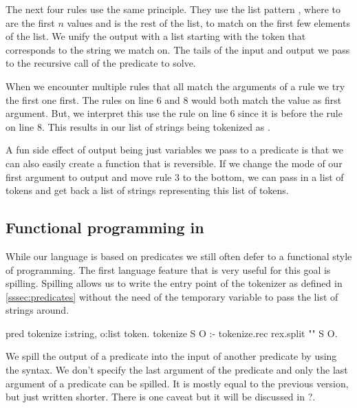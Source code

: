 \documentclass[thesis.tex]{subfiles}
\begin{document}
{The next four rules use the same principle. They use the list pattern \elpiinline{[E1, ..., En | TL]}, where  to  are the first $n$ values and  is the rest of the list, to match on the first few elements of the list. We unify the output with a list starting with the token that corresponds to the string we match on. The tails of the input and output we pass to the recursive call of the predicate to solve.

When we encounter multiple rules that all match the arguments of a rule we try the first one first. The rules on line 6 and 8 would both match the value \elpiinline{["/", "/", "="]} as first argument. But, we interpret this use the rule on line 6 since it is before the rule on line 8. This results in our list of strings being tokenized as .

A fun side effect of output being just variables we pass to a predicate is that we can also easily create a function that is reversible. If we change the mode of our first argument to output and move rule 3 to the bottom, we can pass in a list of tokens and get back a list of strings representing this list of tokens.

\subsection{Functional programming in \elpi}
While our language is based on predicates we still often defer to a functional style of programming. The first language feature that is very useful for this goal is spilling. Spilling allows us to write the entry point of the tokenizer as defined in \cref*{sssec:predicates} without the need of the temporary variable to pass the list of strings around.
\begin{elpicode}
  pred tokenize i:string, o:list token.
  tokenize S O :- tokenize.rec {rex.split "" S} O.
\end{elpicode}

We spill the output of a predicate into the input of another predicate by using the \elpiinline{{ }} syntax. We don't specify the last argument of the predicate and only the last argument of a predicate can be spilled. It is mostly equal to the previous version, but just written shorter. There is one caveat but it will be discussed in ?.

}
\end{document}
